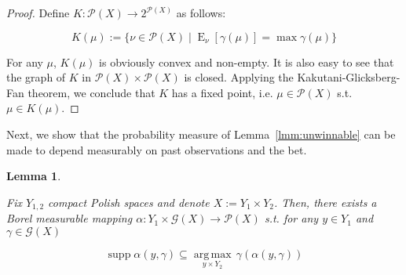 \documentclass[11pt]{article}
\theoremstyle{definition}
\theoremstyle{plain}
\newtheorem{lemma}{Lemma}%
\newcommand{\Argmax}[1]{\underset{#1}{\operatorname{arg\,max}}\,}
\DeclareMathOperator{\E}{E}
\newcommand{\PM}{\mathcal{P}}
\DeclareMathOperator{\Sp}{supp}
\newcommand{\Gm}{\mathcal{G}}
\begin{document}
\begin{proof}

Define ${K: \PM(X) \rightarrow 2^{\PM(X)}}$ as follows:

\[K(\mu):=\{\nu \in \PM(X) \mid \E_\nu[\gamma(\mu)] = \max \gamma(\mu)\}\]

For any ${\mu}$, ${K}(\mu)$ is obviously convex and non-empty. It is also easy to see that the graph of $K$ in $\PM(X) \times \PM(X)$ is closed. Applying the Kakutani-Glicksberg-Fan theorem, we conclude that $K$ has a fixed point, i.e. $\mu \in \PM(X)$ s.t. $\mu \in K(\mu)$.

\end{proof}

Next, we show that the probability measure of Lemma~\ref{lmm:unwinnable} can be made to depend measurably on past observations and the bet.

\begin{lemma}
\label{lmm:measurable_unwinnable}

Fix $Y_{1,2}$ compact Polish spaces and denote $X:=Y_1 \times Y_2$. Then, there exists a Borel measurable mapping $\alpha: Y_1 \times \Gm(X) \rightarrow \PM(X)$ s.t. for any $y \in Y_1$ and $\gamma \in \Gm(X)$

\begin{equation}
\Sp \alpha(y,\gamma) \subseteq \Argmax{y \times Y_2} \gamma(\alpha(y,\gamma))
\end{equation}

\end{lemma}
\end{document}
